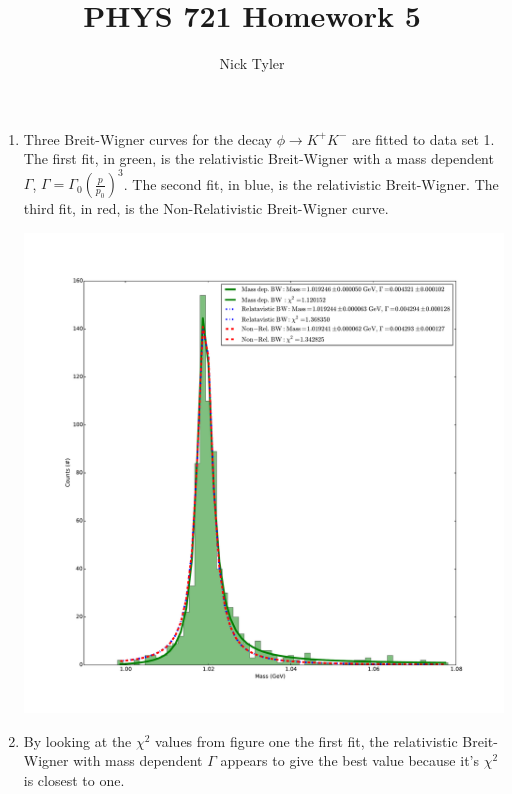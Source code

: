 \documentclass[pdftex]{article}
\title{PHYS 721 Homework 5}
\author{Nick Tyler}
\date{}
\begin{document}
\maketitle
\begin{enumerate}
	\item Three Breit-Wigner curves for the decay $\phi \rightarrow K^{+} K^{-}$ are fitted to data set 1. 
		The first fit, in green, is the relativistic Breit-Wigner with a mass dependent $\Gamma$, 
		$\Gamma = \Gamma_{0} \left( \frac{p}{p_0} \right)^3$. The second fit, in blue, is the relativistic Breit-Wigner. 
		The third fit, in red, is the Non-Relativistic Breit-Wigner curve. \

		\includegraphics[scale=0.35]{Problem_1_and_2.pdf}\\
		
	\pagebreak

	\item By looking at the $\chi^2$ values from figure one the first fit, the relativistic Breit-Wigner
		with mass dependent $\Gamma$ appears to give the best value because it's $\chi^2$ is closest to one.



\end{enumerate}
\end{document}
